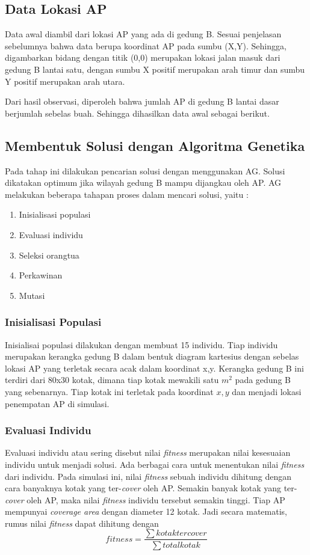 \documentclass[12pt,a4paper]{report}
\begin{document}
		\subsection{Data Lokasi AP}
		Data awal diambil dari lokasi AP yang ada di gedung B. Sesuai penjelasan sebelumnya bahwa data berupa koordinat AP pada sumbu (X,Y). Sehingga, digambarkan bidang dengan titik (0,0) merupakan lokasi jalan masuk dari gedung B lantai satu, dengan sumbu X positif merupakan arah timur dan sumbu Y positif merupakan arah utara.
		
		Dari hasil observasi, diperoleh bahwa jumlah AP di gedung B lantai dasar berjumlah sebelas buah. Sehingga dihasilkan data awal sebagai berikut.
		\subsection{Membentuk Solusi dengan Algoritma Genetika}
		Pada tahap ini dilakukan pencarian solusi dengan menggunakan AG. Solusi dikatakan optimum jika wilayah  gedung B mampu dijangkau oleh AP. AG melakukan beberapa tahapan proses dalam mencari solusi, yaitu :
		\begin{enumerate}
			\item Inisialisasi populasi
			\item Evaluasi individu
			\item Seleksi orangtua
			\item Perkawinan
			\item Mutasi
		\end{enumerate}
		\subsubsection{Inisialisasi Populasi}
		Inisialisai populasi dilakukan dengan membuat 15 individu. Tiap individu merupakan kerangka gedung B dalam bentuk diagram kartesius dengan sebelas lokasi AP yang terletak secara acak dalam koordinat x,y. Kerangka gedung B ini terdiri dari 80x30 kotak, dimana tiap kotak mewakili satu $ m^{2} $ pada gedung B yang sebenarnya. Tiap kotak ini terletak pada koordinat $x,y$ dan menjadi lokasi penempatan AP di simulasi.
		\subsubsection{Evaluasi Individu}
		Evaluasi individu atau sering disebut nilai \emph{fitness} merupakan nilai kesesuaian individu untuk menjadi solusi. Ada berbagai cara untuk menentukan nilai \emph{fitness} dari individu. Pada simulasi ini, nilai \emph{fitness} sebuah individu dihitung dengan cara banyaknya kotak yang ter-\emph{cover} oleh AP. Semakin banyak kotak yang ter-\emph{cover} oleh AP, maka nilai \emph{fitness} individu tersebut semakin tinggi. Tiap AP mempunyai \emph{coverage area} dengan diameter 12 kotak. Jadi secara matematis, rumus nilai \emph{fitness} dapat dihitung dengan
		\[ fitness=\frac{\sum kotak tercover}{\sum total kotak} \]
		
\end{document}
